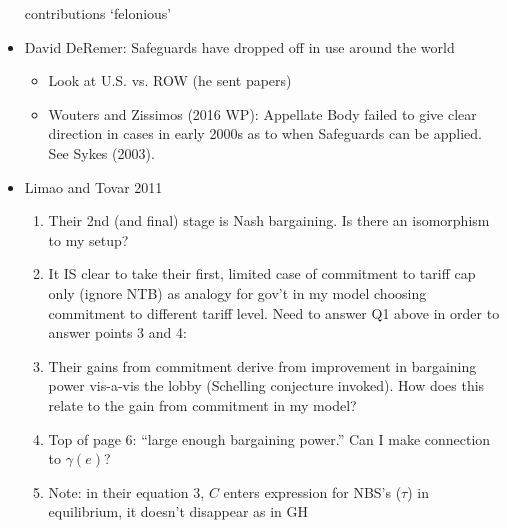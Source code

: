 \documentclass[12pt]{article}
\newcommand{\ga}{\gamma}
\begin{document}
\begin{itemize}
	 contributions `felonious'
	\item David DeRemer: Safeguards have dropped off in use around the world
		\begin{itemize}
			\item Look at U.S. vs. ROW (he sent papers)
			\item Wouters and Zissimos (2016 WP): Appellate Body failed to give clear direction in cases in early 2000s as to when Safeguards can be applied. See Sykes (2003).
		\end{itemize}
	\item Limao and Tovar 2011
		\begin{enumerate}
			\item Their 2nd (and final) stage is Nash bargaining. Is there an isomorphism to my setup?
			\item It IS clear to take their first, limited case of commitment to tariff cap only (ignore NTB) as analogy for gov't in my model choosing commitment to different tariff level. Need to answer Q1 above in order to answer points 3 and 4:
			\item Their gains from commitment derive from improvement in bargaining power vis-a-vis the lobby (Schelling conjecture invoked). How does this relate to the gain from commitment in my model?
			\item Top of page 6: ``large enough bargaining power.'' Can I make connection to $\ga(e)$?
			\item Note: in their equation 3, $C$ enters expression for NBS's ($\tau$) in equilibrium, it doesn't disappear as in GH
		\end{enumerate}
\end{itemize}
\end{document}
